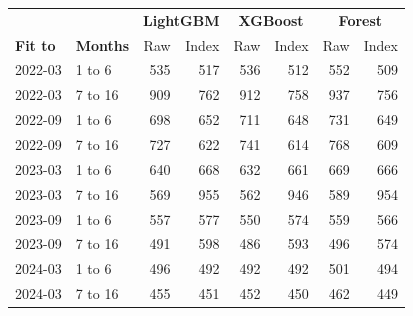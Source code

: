 \begin{tabular}{llrrrrrr}
\hline
 & & \multicolumn{2}{c}{\textbf{LightGBM}} & \multicolumn{2}{c}{\textbf{XGBoost}} & \multicolumn{2}{c}{\textbf{Forest}} \\
\textbf{Fit to} & \textbf{Months} & Raw & Index & Raw & Index & Raw & Index \\
\hline
2022-03 & 1 to 6 & 535 & 517 & 536 & 512 & 552 & 509 \\
2022-03 & 7 to 16 & 909 & 762 & 912 & 758 & 937 & 756 \\
2022-09 & 1 to 6 & 698 & 652 & 711 & 648 & 731 & 649 \\
2022-09 & 7 to 16 & 727 & 622 & 741 & 614 & 768 & 609 \\
2023-03 & 1 to 6 & 640 & 668 & 632 & 661 & 669 & 666 \\
2023-03 & 7 to 16 & 569 & 955 & 562 & 946 & 589 & 954 \\
2023-09 & 1 to 6 & 557 & 577 & 550 & 574 & 559 & 566 \\
2023-09 & 7 to 16 & 491 & 598 & 486 & 593 & 496 & 574 \\
2024-03 & 1 to 6 & 496 & 492 & 492 & 492 & 501 & 494 \\
2024-03 & 7 to 16 & 455 & 451 & 452 & 450 & 462 & 449 \\
\hline
\end{tabular}
